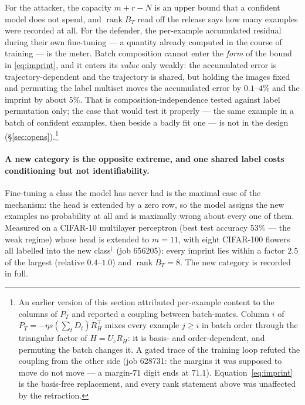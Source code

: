 For the attacker, the capacity $m+r-N$ is an upper bound that a confident
model does not spend, and $\operatorname{rank}B_T$ read off the release says
how many examples were recorded at all. For the defender, the per-example
accumulated residual during their own fine-tuning — a quantity already
computed in the course of training — is the meter. Batch composition cannot
enter the \emph{form} of the bound in \eqref{eq:imprint}, and it enters its
\emph{value} only weakly: the accumulated error is trajectory-dependent and
the trajectory is shared, but holding the images fixed and permuting the
label multiset moves the accumulated error by $0.1$--$4\%$ and the imprint
by about $5\%$. That is composition-independence tested against label
permutation only; the case that would test it properly — the same example in
a batch of confident examples, then beside a badly fit one — is not in the
design (\S\ref{sec:opens}).\footnote{An earlier version of this section attributed per-example
content to the columns of $P_T$ and reported a coupling between batch-mates.
Column $i$ of $P_T=-\eta s(\sum_tD_t)R_H^{\!\top}$ mixes every example
$j\ge i$ in batch order through the triangular factor of $H=U_cR_H$: it is
basis- and order-dependent, and permuting the batch changes it. A gated
trace of the training loop refuted the coupling from the other side (job
628731: the margins it was supposed to move do not move — a margin-$71$
digit ends at $71.1$). Equation~\eqref{eq:imprint} is the basis-free
replacement, and every rank statement above was unaffected by the
retraction.}

\paragraph{A new category is the opposite extreme, and one shared label
costs conditioning but not identifiability.} Fine-tuning a class the model
has never had is the maximal case of the mechanism: the head is extended by
a zero row, so the model assigns the new examples no probability at all and
is maximally wrong about every one of them. Measured on a CIFAR-10
multilayer perceptron (best test accuracy $53\%$ — the weak regime) whose
head is extended to $m=11$, with eight CIFAR-100 flowers all labelled into
the new class$^\dagger$ (job 656205): every imprint lies within a factor
$2.5$ of the largest (relative $0.4$--$1.0$) and $\operatorname{rank}B_T=8$.
The new category is recorded in full.


